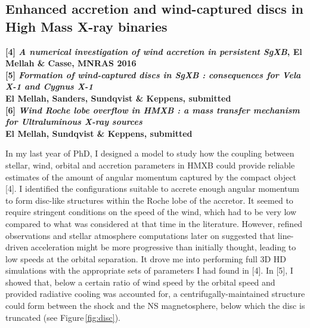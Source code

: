 \documentclass[letterpaper,12pt,onecolumn]{article}
\makeatletter
\newcommand*{\hmxb}{HMXB\@\xspace}
\newcommand*{\ns}{NS\@\xspace}
\makeatother
\begin{document}
\subsection*{Enhanced accretion and wind-captured discs in High Mass X-ray binaries}

\footnotesize
\textbf{[4] \textit{A numerical investigation of wind accretion in persistent SgXB}, El Mellah \& Casse, MNRAS 2016}\\
\textbf{[5] \textit{Formation of wind-captured discs in SgXB : consequences for Vela X-1 and Cygnus X-1}}\\
\hspace*{16pt}\textbf{El Mellah, Sanders, Sundqvist \& Keppens, submitted}\\
\textbf{[6] \textit{Wind Roche lobe overflow in HMXB : a mass transfer mechanism for Ultraluminous X-ray sources}}\\
\hspace*{16pt}\textbf{El Mellah, Sundqvist \& Keppens, submitted}\\

\normalsize


In my last year of PhD, I designed a model to study how the coupling between stellar, wind, orbital and accretion parameters in \hmxb could provide reliable estimates of the amount of angular momentum captured by the compact object [4]. I identified the configurations suitable to accrete enough angular momentum to form disc-like structures within the Roche lobe of the accretor. It seemed to require stringent conditions on the speed of the wind, which had to be very low compared to what was considered at that time in the literature. However, refined observations and stellar atmosphere computations later on suggested that line-driven acceleration might be more progressive than initially thought, leading to low speeds at the orbital separation. It drove me into performing full 3D HD simulations with the appropriate sets of parameters I had found in [4]. In [5], I showed that, below a certain ratio of wind speed by the orbital speed and provided radiative cooling was accounted for, a centrifugally-maintained structure could form between the shock and the \ns magnetosphere, below which the disc is truncated (see Figure\,\ref{fig:disc}). 
\end{document}

